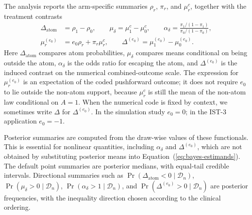 \documentclass[11pt]{article}
\begin{document}
The analysis reports the arm-specific summaries \(\rho_r\), \(\pi_r\), and \(\mu_r^c\), together with the treatment contrasts
\begin{align}
  \Delta_{\mathrm{atom}}
  &= \rho_1-\rho_0,
  \qquad
  \mu_\delta
  = \mu_1^c-\mu_0^c,
  \qquad
  \alpha_\delta
  =
  \frac{\pi_1/(1-\pi_1)}{\pi_0/(1-\pi_0)},
  \nonumber\\
  \mu_r^{(e_0)}
  &= e_0\rho_r+\pi_r\mu_r^c,
  \qquad
  \Delta^{(e_0)}
  = \mu_1^{(e_0)}-\mu_0^{(e_0)}.
  \label{eq:bayes-estimands}
\end{align}
Here \(\Delta_{\mathrm{atom}}\) compares atom probabilities, \(\mu_\delta\) compares means conditional on being outside the atom, \(\alpha_\delta\) is the odds ratio for escaping the atom, and \(\Delta^{(e_0)}\) is the induced contrast on the numerical combined-outcome scale.
The expression for \(\mu_r^{(e_0)}\) is an expectation of the coded pushforward outcome; it does not require \(e_0\) to lie outside the non-atom support, because \(\mu_r^c\) is still the mean of the non-atom law conditional on \(A=1\).
When the numerical code is fixed by context, we sometimes write \(\Delta\) for \(\Delta^{(e_0)}\). In the simulation study \(e_0=0\); in the IST-3 application \(e_0=-1\).

Posterior summaries are computed from the draw-wise values of these functionals.
This is essential for nonlinear quantities, including \(\alpha_\delta\) and \(\Delta^{(e_0)}\), which are not obtained by substituting posterior means into Equation~(\ref{eq:bayes-estimands}).
The default point summaries are posterior medians, with equal-tail credible intervals.
Directional summaries such as \(\Pr(\Delta_{\mathrm{atom}}<0\mid\mathcal{D}_n)\), \(\Pr(\mu_\delta>0\mid\mathcal{D}_n)\), \(\Pr(\alpha_\delta>1\mid\mathcal{D}_n)\), and \(\Pr(\Delta^{(e_0)}>0\mid\mathcal{D}_n)\) are posterior frequencies, with the inequality direction chosen according to the clinical ordering.
\end{document}
